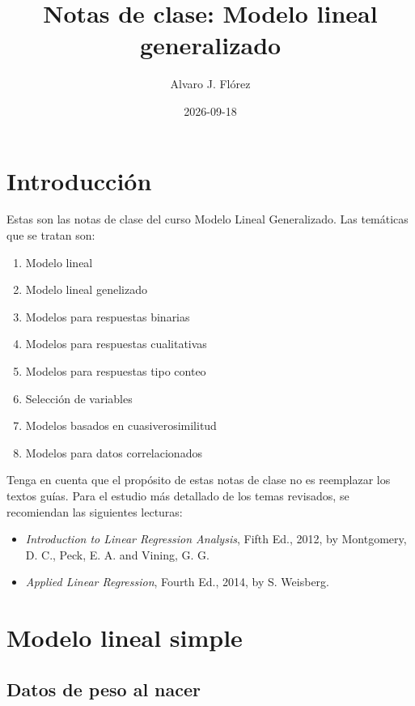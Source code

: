 \documentclass[
]{article}
\title{Notas de clase: Modelo lineal generalizado}
\author{Alvaro J. Flórez}
\date{2026-09-18}
\providecommand{\tightlist}{%
  \setlength{\itemsep}{0pt}\setlength{\parskip}{0pt}}
\begin{document}
\maketitle

{
\setcounter{tocdepth}{2}
\tableofcontents
}
\section*{Introducción}\label{introducciuxf3n}

Estas son las notas de clase del curso Modelo Lineal Generalizado. Las temáticas que se tratan son:

\begin{enumerate}
\def\labelenumi{\arabic{enumi}.}
\tightlist
\item
  Modelo lineal
\item
  Modelo lineal genelizado
\item
  Modelos para respuestas binarias
\item
  Modelos para respuestas cualitativas
\item
  Modelos para respuestas tipo conteo
\item
  Selección de variables
\item
  Modelos basados en cuasiverosimilitud
\item
  Modelos para datos correlacionados
\end{enumerate}

Tenga en cuenta que el propósito de estas notas de clase no es reemplazar los textos guías. Para el estudio más detallado de los temas revisados, se recomiendan las siguientes lecturas:

\begin{itemize}
\tightlist
\item
  \emph{Introduction to Linear Regression Analysis}, Fifth Ed., 2012, by Montgomery, D. C., Peck, E. A. and Vining, G. G.
\item
  \emph{Applied Linear Regression}, Fourth Ed., 2014, by S. Weisberg.
\end{itemize}

\section{Modelo lineal simple}\label{modelo-lineal-simple}

\subsection*{Datos de peso al nacer}\label{datos-de-peso-al-nacer}
\end{document}
